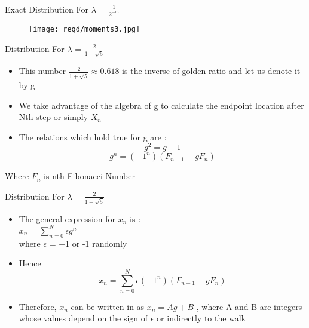 \documentclass{beamer}
\begin{document}
\begin{frame}{Exact Distribution For $\lambda$ = $\frac{1}{2^{-m}}$}
	\begin{figure}
    		\centering
    		\texttt{[image: reqd/moments3.jpg]}
	\end{figure}
\end{frame}

\begin{frame}{Distribution For $\lambda$ = $\frac{2}{1+\sqrt{5}}$}
	\begin{itemize}
	\setlength\itemsep{1em}
		\item{\large This number $\frac{2}{1+\sqrt{5}} \approx 0.618$ is the inverse of golden ratio and let us denote it by g}
		\item{\large We take advantage of the algebra of g to calculate the endpoint location after Nth step or simply $X_{n}$}
		\item{\large The relations which hold true for g are :}
		\begin{equation}
			g^{2}=g-1
		\end{equation}
		\begin{equation}
			g^{n}=(-1^{n})(F_{n-1}-gF_{n})
		\end{equation}
	\end{itemize}
	\vspace{1em}
	\centering
	Where $F_{n}$ is nth Fibonacci Number
\end{frame}

\begin{frame}{Distribution For $\lambda$ = $\frac{2}{1+\sqrt{5}}$}
	\begin{itemize}
	\setlength\itemsep{1em}
		\item{\large The general expression for $x_{n}$ is :\\
		\vspace{1em} \hspace{5em}
		$x_{n}=\sum_{n=0}^{N}\epsilon g^{n}$\\
		\vspace{1em}
		where $\epsilon$ = +1 or -1 randomly}
		\item{\large Hence}
		\begin{equation}
			x_{n}=\sum_{n=0}^{N}\epsilon (-1^{n})(F_{n-1}-gF_{n})
		\end{equation}
		\item{\large Therefore, $x_{n}$ can be written in as $x_{n}=Ag+B$ , where A and B are integers whose values depend on the sign of $\epsilon$ or indirectly to the walk}
	\end{itemize}
\end{frame}
\end{document}
